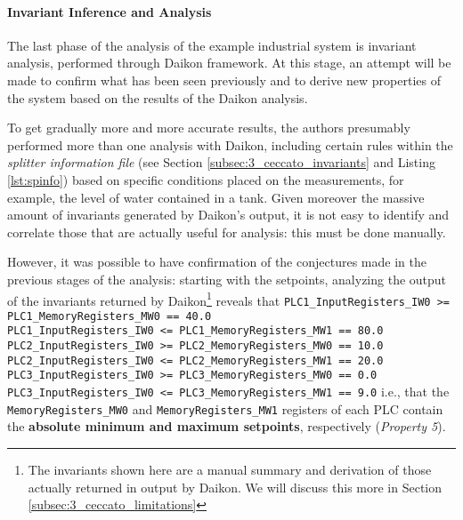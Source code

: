 \paragraph{Invariant Inference and Analysis}
\label{par:3_invariant_appl}
The last phase of the analysis of the example industrial system is invariant analysis, performed through Daikon framework. At this stage, an attempt will be made to confirm what has been seen previously and to derive new properties of the system based on the results of the Daikon analysis.

\bigskip
To get gradually more and more accurate results, the authors presumably performed more than one analysis with Daikon, including certain rules within the \textit{splitter information file} (see Section \ref{subsec:3_ceccato_invariants} and Listing \ref{lst:spinfo}) based on specific conditions placed on the measurements, for example, the level of water contained in a tank. Given moreover the massive amount of invariants generated by Daikon's output, it is not easy to identify and correlate those that are actually useful for analysis: this must be done manually.

\bigskip
However, it was possible to have confirmation of the conjectures made in the previous stages of the analysis: starting with the setpoints, analyzing the output of the invariants returned by Daikon\footnote{The invariants shown here are a manual summary and derivation of those actually returned in output by Daikon. We will discuss this more in Section \ref{subsec:3_ceccato_limitations}} reveals that \newline \newline
\small\texttt{PLC1\_InputRegisters\_IW0 >= PLC1\_MemoryRegisters\_MW0 == 40.0}\\
\texttt{PLC1\_InputRegisters\_IW0 <= PLC1\_MemoryRegisters\_MW1 == 80.0}\\
\texttt{PLC2\_InputRegisters\_IW0 >= PLC2\_MemoryRegisters\_MW0 == 10.0}\\
\texttt{PLC2\_InputRegisters\_IW0 <= PLC2\_MemoryRegisters\_MW1 == 20.0}\\
\texttt{PLC3\_InputRegisters\_IW0 >= PLC3\_MemoryRegisters\_MW0 == 0.0}\\
\texttt{PLC3\_InputRegisters\_IW0 <= PLC3\_MemoryRegisters\_MW1 == 9.0} \newline \newline
\normalsize i.e., that the \texttt{MemoryRegisters\_MW0} and \texttt{MemoryRegisters\_MW1} registers of each PLC contain the \textbf{absolute minimum and maximum setpoints}, respectively (\textit{Property 5}).

